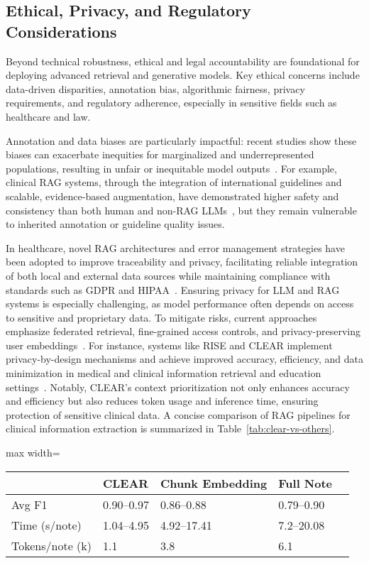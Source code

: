 \documentclass[sigconf]{acmart}
\begin{document}
\subsection{Ethical, Privacy, and Regulatory Considerations}

Beyond technical robustness, ethical and legal accountability are foundational for deploying advanced retrieval and generative models. Key ethical concerns include data-driven disparities, annotation bias, algorithmic fairness, privacy requirements, and regulatory adherence, especially in sensitive fields such as healthcare and law.

Annotation and data biases are particularly impactful: recent studies show these biases can exacerbate inequities for marginalized and underrepresented populations, resulting in unfair or inequitable model outputs~\cite{ref2,ref3,ref54}. For example, clinical RAG systems, through the integration of international guidelines and scalable, evidence-based augmentation, have demonstrated higher safety and consistency than both human and non-RAG LLMs~\cite{ref2,ref3}, but they remain vulnerable to inherited annotation or guideline quality issues.

In healthcare, novel RAG architectures and error management strategies have been adopted to improve traceability and privacy, facilitating reliable integration of both local and external data sources while maintaining compliance with standards such as GDPR and HIPAA~\cite{ref14,ref15,ref24}. Ensuring privacy for LLM and RAG systems is especially challenging, as model performance often depends on access to sensitive and proprietary data. To mitigate risks, current approaches emphasize federated retrieval, fine-grained access controls, and privacy-preserving user embeddings~\cite{ref21,ref55}. For instance, systems like RISE and CLEAR implement privacy-by-design mechanisms and achieve improved accuracy, efficiency, and data minimization in medical and clinical information retrieval and education settings~\cite{ref3,ref55}. Notably, CLEAR's context prioritization not only enhances accuracy and efficiency but also reduces token usage and inference time, ensuring protection of sensitive clinical data. A concise comparison of RAG pipelines for clinical information extraction is summarized in Table~\ref{tab:clear-vs-others}.

\begin{table*}[htbp]
\centering
\caption{Comparison of RAG Pipelines on Clinical Information Extraction~\cite{ref3}.}
\label{tab:clear-vs-others}
\begin{adjustbox}{max width=\textwidth}
\begin{tabular}{@{}lllll@{}}
\toprule
 & CLEAR & Chunk Embedding & Full Note \\
\midrule
Avg F1                & 0.90--0.97     & 0.86--0.88 & 0.79--0.90 \\
Time (s/note)         & 1.04--4.95     & 4.92--17.41 & 7.2--20.08 \\
Tokens/note (k)       & 1.1            & 3.8        & 6.1        \\
\bottomrule
\end{tabular}
\end{adjustbox}
\end{table*}
\end{document}
